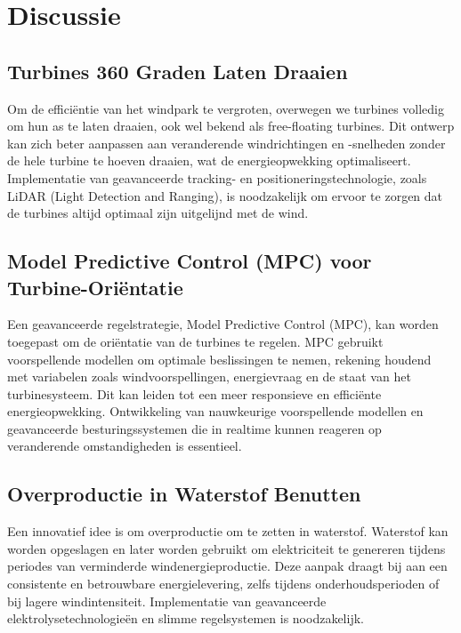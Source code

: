 \section{Discussie}
\subsection{Turbines 360 Graden Laten Draaien}
Om de efficiëntie van het windpark te vergroten, overwegen we turbines volledig om hun as te laten draaien, ook wel bekend als free-floating turbines\cite{9136371}. Dit ontwerp kan zich beter aanpassen aan veranderende windrichtingen en -snelheden zonder de hele turbine te hoeven draaien, wat de energieopwekking optimaliseert. Implementatie van geavanceerde tracking- en positioneringstechnologie, zoals LiDAR (Light Detection and Ranging), is noodzakelijk om ervoor te zorgen dat de turbines altijd optimaal zijn uitgelijnd met de wind.\cite{8511422}

\subsection{Model Predictive Control (MPC) voor Turbine-Oriëntatie}
Een geavanceerde regelstrategie, Model Predictive Control (MPC), kan worden toegepast om de oriëntatie van de turbines te regelen. MPC gebruikt voorspellende modellen om optimale beslissingen te nemen, rekening houdend met variabelen zoals windvoorspellingen, energievraag en de staat van het turbinesysteem. Dit kan leiden tot een meer responsieve en efficiënte energieopwekking. Ontwikkeling van nauwkeurige voorspellende modellen en geavanceerde besturingssystemen die in realtime kunnen reageren op veranderende omstandigheden is essentieel.\cite{9255096}

\subsection{Overproductie in Waterstof Benutten}
Een innovatief idee is om overproductie om te zetten in waterstof. Waterstof kan worden opgeslagen en later worden gebruikt om elektriciteit te genereren tijdens periodes van verminderde windenergieproductie. Deze aanpak draagt bij aan een consistente en betrouwbare energielevering, zelfs tijdens onderhoudsperioden of bij lagere windintensiteit. Implementatie van geavanceerde elektrolysetechnologieën en slimme regelsystemen is noodzakelijk.\cite{10116157,9844498,8605079}

